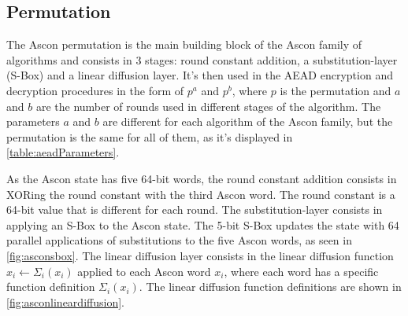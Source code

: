 \documentclass[11pt,twoside]{article}
\begin{document}
\subsection{Permutation}

The Ascon permutation is the main building block of the Ascon family of algorithms and consists in 3 stages: round constant addition, a substitution-layer (S-Box) and a linear diffusion layer. It's then used in the AEAD encryption and decryption procedures in the form of $p^a$ and $p^b$, where $p$ is the permutation and $a$ and $b$ are the number of rounds used in different stages of the algorithm. The parameters $a$ and $b$ are different for each algorithm of the Ascon family, but the permutation is the same for all of them, as it's displayed in \cref{table:aeadParameters}.

As the Ascon state has five 64-bit words, the round constant addition consists in XORing the round constant with the third Ascon word. The round constant is a 64-bit value that is different for each round. The substitution-layer consists in applying an S-Box to the Ascon state. The 5-bit S-Box updates the state with 64 parallel applications of substitutions to the five Ascon words, as seen in \cref{fig:asconsbox}. The linear diffusion layer consists in the linear diffusion function $x_i \leftarrow \Sigma_i(x_i)$ applied to each Ascon word $x_i$, where each word has a specific function definition $\Sigma_i(x_i)$. The linear diffusion function definitions are shown in \cref{fig:asconlineardiffusion}.
\end{document}
